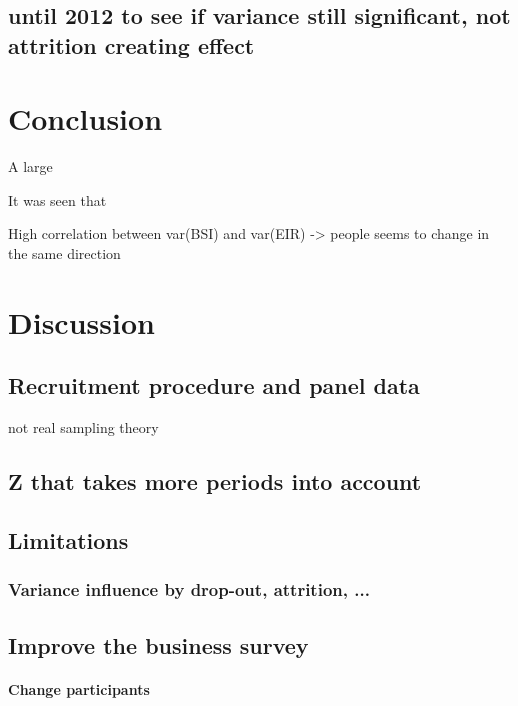 \documentclass[12pt,a4paper,oneside]{book}
\begin{document}
\section{until 2012 to see if variance still significant, not attrition creating effect}







\chapter{Conclusion}

A large 

It was seen that


High correlation between var(BSI) and var(EIR) -> people seems to change in the same direction


\chapter{Discussion}

\section{Recruitment procedure and panel data}
not real sampling theory



\section{Z that takes more periods into account}



\section{Limitations}

\subsection*{Variance influence by drop-out, attrition, ...}

\section{Improve the business survey}

\subsubsection*{Change participants}
\end{document}
